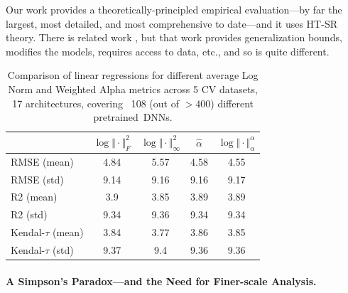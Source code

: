 \documentclass{article}
\begin{document}
Our work provides a theoretically-principled empirical evaluation---by far the largest, most detailed, and most comprehensive to date---and it uses HT-SR theory.
%
There is related work \cite{BFT17_TR,LMBx18_TR}, but that work provides generalization bounds, modifies the models, requires access to data, etc., and so is quite different.



\begin{table}[t]
\small
\begin{center}
\begin{tabular}{|p{0.83in}|c|c|c|c|}
\hline
  & $\log\Vert\cdot\Vert^{2}_{F}$ & $\log\Vert\cdot\Vert^{2}_{\infty}$ & $\hat{\alpha}$ & $\log\Vert\cdot\Vert^{\alpha}_{\alpha}$ \\
\hline

RMSE (mean) & 4.84 & 5.57 & 4.58& 4.55 \\
RMSE (std) & 9.14 & 9.16 & 9.16& 9.17 \\
\hline
R2 (mean) & 3.9 & 3.85 & 3.89& 3.89 \\
R2 (std) & 9.34 & 9.36 & 9.34& 9.34 \\
\hline
Kendal-$\tau$ (mean) & 3.84 & 3.77 & 3.86& 3.85 \\
Kendal-$\tau$ (std) & 9.37 & 9.4 & 9.36& 9.36 \\
\hline

\hline
\end{tabular}
\end{center}
\vspace{-4mm}
\caption{Comparison of linear regressions for different average Log Norm and Weighted Alpha metrics across 5 CV datasets, 17 architectures, covering \
108 (out of $>400$) different pretrained~DNNs.
}
\label{table:results}
\end{table}


\vspace{-4mm}
\paragraph{A Simpson's Paradox---and the Need for Finer-scale Analysis.}
\end{document}
